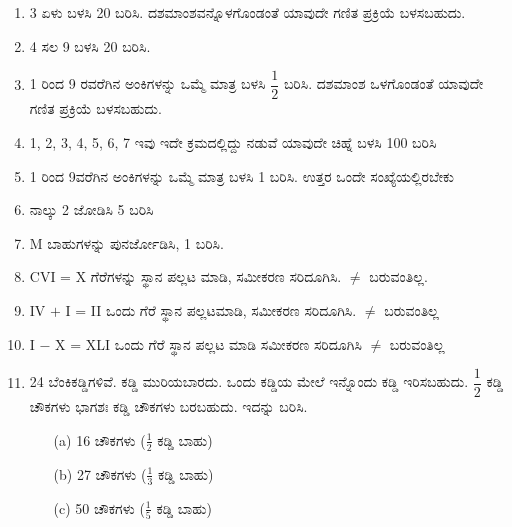 \chapter{}\label{chap7}

\begin{enumerate}
\renewcommand{\labelenumi}{\bf\theenumi.}
\itemsep=5pt

\item 3 ಏಳು ಬಳಸಿ 20 ಬರಿಸಿ. ದಶಮಾಂಶವನ್ನೊಳಗೊಂಡಂತೆ ಯಾವುದೇ ಗಣಿತ ಪ್ರಕ್ರಿಯೆ ಬಳಸಬಹುದು. 

\item 4 ಸಲ 9 ಬಳಸಿ 20 ಬರಿಸಿ. 

\item 1 ರಿಂದ 9 ರವರೆಗಿನ ಅಂಕಿಗಳನ್ನು ಒಮ್ಮೆ ಮಾತ್ರ ಬಳಸಿ $\dfrac{1}{2}$ ಬರಿಸಿ. ದಶಮಾಂಶ ಒಳಗೊಂಡಂತೆ ಯಾವುದೇ ಗಣಿತ ಪ್ರಕ್ರಿಯೆ ಬಳಸಬಹುದು. 

\item 1, 2, 3, 4, 5, 6, 7 ಇವು ಇದೇ ಕ್ರಮದಲ್ಲಿದ್ದು ನಡುವೆ ಯಾವುದೇ ಚಿಹ್ನೆ ಬಳಸಿ 100 ಬರಿಸಿ 

\item 1 ರಿಂದ 9ವರೆಗಿನ ಅಂಕಿಗಳನ್ನು ಒಮ್ಮೆ ಮಾತ್ರ ಬಳಸಿ 1 ಬರಿಸಿ. ಉತ್ತರ ಒಂದೇ ಸಂಖ್ಯೆಯಲ್ಲಿರಬೇಕು

\item ನಾಲ್ಕು 2 ಜೋಡಿಸಿ 5  ಬರಿಸಿ 

\item M ಬಾಹುಗಳನ್ನು ಪುನರ್ಜೋಡಿಸಿ, 1 ಬರಿಸಿ. 

\item CVI = X ಗೆರೆಗಳನ್ನು ಸ್ಥಾನ ಪಲ್ಲಟ ಮಾಡಿ, ಸಮೀಕರಣ ಸರಿದೂಗಿಸಿ. $\neq$ ಬರುವಂತಿಲ್ಲ. 

\item IV $+$ I = II ಒಂದು ಗೆರೆ ಸ್ಥಾನ ಪಲ್ಲಟಮಾಡಿ, ಸಮೀಕರಣ ಸರಿದೂಗಿಸಿ. $\neq$ ಬರುವಂತಿಲ್ಲ

\item I $-$ X = XLI ಒಂದು ಗೆರೆ ಸ್ಥಾನ ಪಲ್ಲಟ ಮಾಡಿ ಸಮೀಕರಣ ಸರಿದೂಗಿಸಿ $\neq$ ಬರುವಂತಿಲ್ಲ

\item 24 ಬೆಂಕಿಕಡ್ಡಿಗಳಿವೆ. ಕಡ್ಡಿ ಮುರಿಯಬಾರದು. ಒಂದು ಕಡ್ಡಿಯ ಮೇಲೆ ಇನ್ನೊಂದು ಕಡ್ಡಿ ಇರಿಸಬಹುದು. $\dfrac{1}{2}$ ಕಡ್ಡಿ ಚೌಕಗಳು ಭಾಗಶಃ ಕಡ್ಡಿ ಚೌಕಗಳು ಬರಬಹುದು. ಇದನ್ನು ಬರಿಸಿ. 
\begin{itemize}
\item[(a)] 16 ಚೌಕಗಳು ($\frac{1}{2}$ ಕಡ್ಡಿ ಬಾಹು)
\item[(b)] 27 ಚೌಕಗಳು ($\frac{1}{3}$ ಕಡ್ಡಿ ಬಾಹು)
\item[(c)] 50 ಚೌಕಗಳು ($\frac{1}{5}$ ಕಡ್ಡಿ ಬಾಹು)
\end{itemize}


\end{enumerate}
